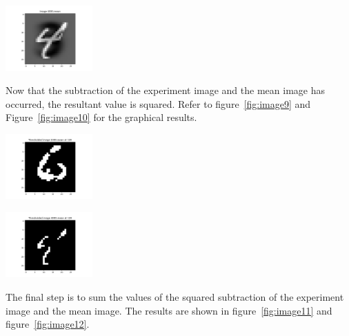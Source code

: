 \begin{center}
\includegraphics[width=0.25\textwidth]{image8.png}
\end{center}

Now that the subtraction of the experiment image and the mean image has occurred, the resultant value is squared. Refer to figure~\ref{fig:image9} and Figure~\ref{fig:image10} for the graphical results.

\begin{center}
\includegraphics[width=0.25\textwidth]{image9.png}
\end{center}

\begin{center}
\includegraphics[width=0.25\textwidth]{image10.png}
\end{center}

The final step is to sum the values of the squared subtraction of the experiment image and the mean image. The results are shown in figure~\ref{fig:image11} and figure~\ref{fig:image12}.
